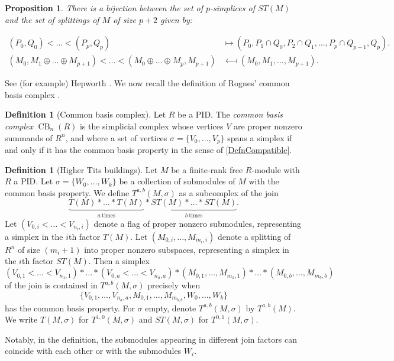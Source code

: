 \documentclass[a4paper]{amsart}
\DeclareMathOperator{\CB}{CB}
\numberwithin{theoremcounter}{section}
\newtheorem{proposition}[propositionauto]{Proposition}
\theoremstyle{definition}
\newtheorem{definition}[Defauto]{Definition}
\theoremstyle{remark}
\begin{document}
\begin{proposition} \label{SplittingtVsSplitFlag} 
There is a bijection between the set of $p$-simplices of $ST(M)$ and the set of splittings of $M$ of size $p+2$ given by:

\begin{align*} (P_0,Q_0) < \dots <(P_p,Q_p) &\longmapsto (P_0,P_1 \cap Q_0,P_2 \cap Q_1, \dots, P_p \cap Q_{p-1},Q_p ).\\
(M_0, M_1 \oplus \dots \oplus M_{p+1}) 
< \dots <(M_0  \oplus \dots \oplus M_p,M_{p+1}) & \longmapsfrom (M_0, M_1, \dots, M_{p+1} ).
\end{align*}
\end{proposition}


See (for example) Hepworth \cite[Proposition 3.4]{Hepworth-Edge}. We now recall the definition of Rognes' common basis complex \cite{Rog1}.

\begin{definition}[Common basis complex] Let $R$ be a PID. 
 The \emph{common basis complex} ${\CB}_n(R)$ is the simplicial complex whose vertices $V$ are proper nonzero summands of $R^n$, and where a set of vertices $\sigma=\{V_0,\dots, V_p\}$ spans a simplex if and only if it has the common basis property in the sense of \autoref{DefnCompatible}. 
\end{definition}



\begin{definition}[Higher Tits buildings] \label{DefnTab}
Let $M$ be a finite-rank free $R$-module with $R$ a PID.  Let $\sigma=\{W_0,\dots,W_k \}$ be a collection of  submodules of $M$ with the common basis property. We define $T^{a,b}(M,\sigma)$ as a subcomplex of the join $$\underbrace{T(M) * \dots * T(M)}_{a\ \text{times}} * \underbrace{ST(M) * \dots * ST(M)}_{b\ \text{times}}.$$ 
Let $ (V_{0,i} < \dots < V_{n_{i},i}  ) $ denote a flag of proper nonzero submodules, representing a simplex in the $i$th factor $T(M)$. Let $(M_{0,i},\dots,M_{m_{i},i})$ denote a splitting of $R^n$ of size $(m_i+1)$ into proper nonzero subspaces, representing a simplex in the $i$th factor $ST(M)$. Then a simplex  
$$ (V_{0,1} < \dots < V_{n_1,1}  ) * \dots * (V_{0,a} < \dots < V_{n_a,a}  ) * (M_{0,1},\dots,M_{m_1,1}  ) * \dots * (M_{0,b},\dots,M_{m_b,b}  ) $$ 
of the join is contained in $T^{a,b}(M,\sigma)$ precisely when $$\{V_{0,1}, \dots, V_{n_a,a}, M_{0,1}, \dots,   M_{m_{b,b}} , W_0, \dots, W_k  \}$$ has the common basis property. For $\sigma$ empty, denote $T^{a,b}(M,\sigma)$ by $T^{a,b}(M)$. We write $T(M, \sigma)$ for $T^{1,0}(M, \sigma)$ and $ST(M, \sigma)$ for $T^{0,1}(M, \sigma)$. 
\end{definition}
Notably, in the definition, the submodules  appearing in different join factors can coincide with each other or with the submodules $W_i$. 
\end{document}
